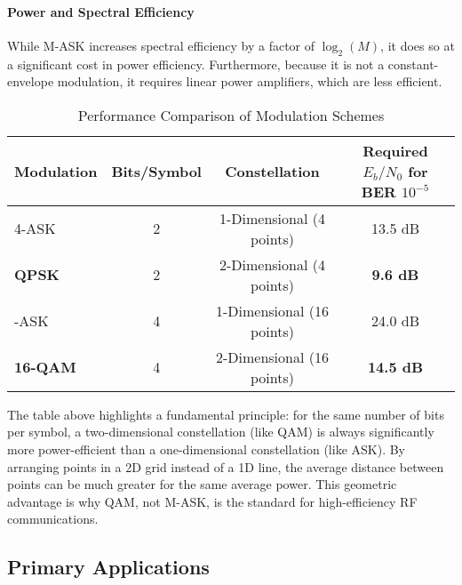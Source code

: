 \paragraph{Power and Spectral Efficiency}
While M-ASK increases spectral efficiency by a factor of $\log_2(M)$, it does so at a significant cost in power efficiency. Furthermore, because it is not a constant-envelope modulation, it requires linear power amplifiers, which are less efficient.

\begin{table}[H]
    \centering
    \caption{Performance Comparison of Modulation Schemes}
    \label{tab:ask-comparison}
    \begin{tabular}{@{}lccc@{}}
        \toprule
        \tableheaderfont Modulation & \tableheaderfont Bits/Symbol & \tableheaderfont Constellation & \tableheaderfont Required $E_b/N_0$ for BER $10^{-5}$ \\
        \midrule
        4-ASK & 2 & 1-Dimensional (4 points) & 13.5 dB \\
        \textbf{QPSK} & 2 & 2-Dimensional (4 points) & \textbf{9.6 dB} \\
        \addlinespace
        16-ASK & 4 & 1-Dimensional (16 points) & 24.0 dB \\
        \textbf{16-QAM} & 4 & 2-Dimensional (16 points) & \textbf{14.5 dB} \\
        \bottomrule
    \end{tabular}
\end{table}

\begin{importantbox}[title={Why QAM is Superior to M-ASK}]
    The table above highlights a fundamental principle: for the same number of bits per symbol, a two-dimensional constellation (like QAM) is always significantly more power-efficient than a one-dimensional constellation (like ASK). By arranging points in a 2D grid instead of a 1D line, the average distance between points can be much greater for the same average power. This geometric advantage is why QAM, not M-ASK, is the standard for high-efficiency RF communications.
\end{importantbox}


\subsection{Primary Applications}

